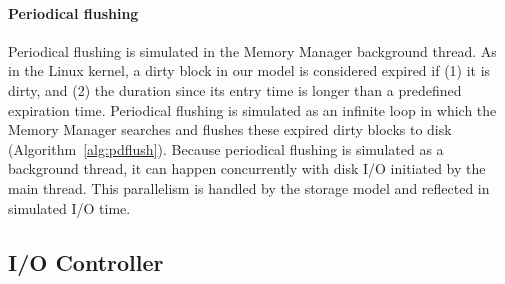 \documentclass[conference]{IEEEtran}
\begin{document}
    \paragraph*{Periodical flushing}
    Periodical flushing is simulated in the Memory Manager
    background thread. As in the Linux kernel, a dirty block
    in our model is considered expired if (1) it is dirty, and (2)
    the duration since its entry time is longer than a
    predefined expiration time. 
    Periodical flushing is simulated as an infinite loop in which 
    the Memory Manager searches and flushes these expired dirty blocks to disk (Algorithm~\ref{alg:pdflush}). 
    Because periodical flushing is simulated as a background thread, it can happen concurrently
    with disk I/O initiated by the main thread. This parallelism is handled by the 
    storage model and reflected in simulated I/O time.

    \subsection{I/O Controller}
     
\end{document}

